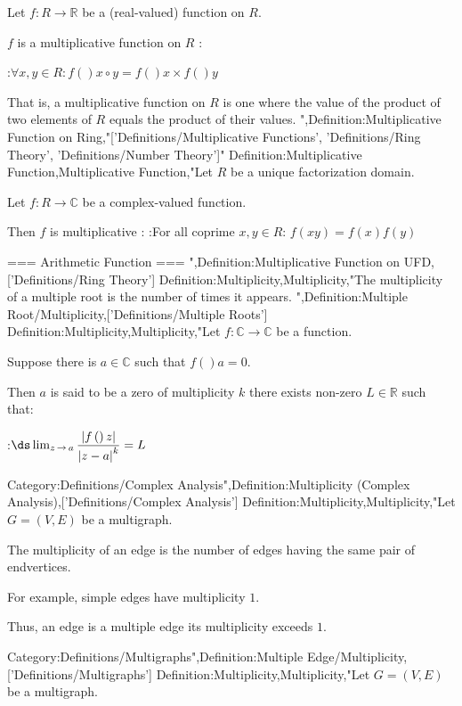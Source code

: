 Let $f: R \to \mathbb R$ be a (real-valued) function on $R$.


$f$ is a multiplicative function on $R$ :

:$\forall x, y \in R: f \left(   \right){x \circ y} = f \left(   \right)x \times f \left(   \right)y$


That is, a multiplicative function on $R$ is one where the value of the product of two elements of $R$ equals the product of their values.
",Definition:Multiplicative Function on Ring,"['Definitions/Multiplicative Functions', 'Definitions/Ring Theory', 'Definitions/Number Theory']"
Definition:Multiplicative Function,Multiplicative Function,"Let $R$ be a unique factorization domain.

Let $f : R \to \mathbb C$ be a complex-valued function.


Then $f$ is multiplicative :
:For all coprime $x, y\in R$: $f \left({x y}\right) = f \left({x}\right) f \left({y}\right)$


=== Arithmetic Function ===
",Definition:Multiplicative Function on UFD,['Definitions/Ring Theory']
Definition:Multiplicity,Multiplicity,"The multiplicity of a multiple root is the number of times it appears.
",Definition:Multiple Root/Multiplicity,['Definitions/Multiple Roots']
Definition:Multiplicity,Multiplicity,"Let $f: \mathbb C \to \mathbb C$ be a function.

Suppose there is $a \in \mathbb C$ such that $f \left(   \right)a = 0$.

Then $a$ is said to be a zero of multiplicity $k$  there exists non-zero $L \in \mathbb R$ such that:

:$\ds \lim_{z \mathop \to a} \dfrac {\left\lvert f \left(   \right)z \right\rvert } {\left\lvert z - a \right\rvert^k} = L$



Category:Definitions/Complex Analysis",Definition:Multiplicity (Complex Analysis),['Definitions/Complex Analysis']
Definition:Multiplicity,Multiplicity,"Let $G = \left( V, E \right)$ be a multigraph.

The multiplicity of an edge is the number of edges having the same pair of endvertices.


For example, simple edges have multiplicity $1$.

Thus, an edge is a multiple edge  its multiplicity exceeds $1$.

Category:Definitions/Multigraphs",Definition:Multiple Edge/Multiplicity,['Definitions/Multigraphs']
Definition:Multiplicity,Multiplicity,"Let $G = \left( V, E \right)$ be a multigraph.

